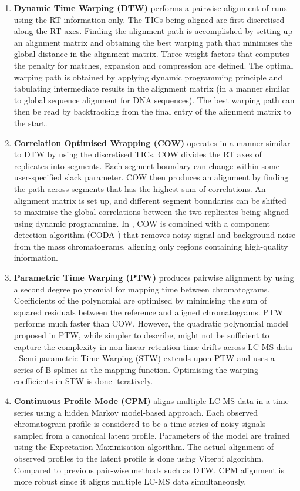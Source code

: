 \begin{enumerate}
\item \textbf{Dynamic Time Warping (DTW)} \cite{Sakoe1978} performs a pairwise alignment of runs using the RT information only. The TICs being aligned are first discretised along the RT axes. Finding the alignment path is accomplished by setting up an alignment matrix and obtaining the best warping path that minimises the global distance in the alignment matrix. Three weight factors that computes the penalty for matches, expansion and compression are defined. The optimal warping path is obtained by applying dynamic programming principle and tabulating intermediate results in the alignment matrix (in a manner similar to global sequence alignment for DNA sequences). The best warping path can then be read by backtracking from the final entry of the alignment matrix to the start. 
\item \textbf{Correlation Optimised Wrapping (COW)} \cite{Nielsen1998} operates in a manner similar to DTW by using the discretised TICs. COW divides the RT axes of replicates into segments. Each segment boundary can change within some user-specified slack parameter. COW then produces an alignment by finding the path across segments that has the highest sum of correlations. An alignment matrix is set up, and different segment boundaries can be shifted to maximise the global correlations between the two replicates being aligned using dynamic programming. In \cite{Christin2008}, COW is combined with a component detection algorithm (CODA \cite{Windig2007}) that removes noisy signal and background noise from the mass chromatograms, aligning only regions containing high-quality information.
\item \textbf{Parametric Time Warping (PTW)} \cite{VanNederkassel2006} produces pairwise alignment by using a second degree polynomial for mapping time between chromatograms. Coefficients of the polynomial are optimised by minimising the sum of squared residuals between the reference and aligned chromatograms. PTW performs much faster than COW. However, the quadratic polynomial model proposed in PTW, while simpler to describe, might not be sufficient to capture the complexity in non-linear retention time drifts across LC-MS data \cite{podwojski2009retention}. Semi-parametric Time Warping (STW) extends upon PTW and uses a series of B-splines as the mapping function. Optimising the warping coefficients in STW is done iteratively.
\item \textbf{Continuous Profile Mode (CPM)} \cite{Listgarten2005} aligns multiple LC-MS data in a time series using a hidden Markov model-based approach. Each observed chromatogram profile is considered to be a time series of noisy signals sampled from a canonical latent profile. Parameters of the model are trained using the Expectation-Maximisation algorithm. The actual alignment of observed profiles to the latent profile is done using Viterbi algorithm. Compared to previous pair-wise methods such as DTW, CPM alignment is more robust since it aligns multiple LC-MS data simultaneously. 
\end{enumerate}


